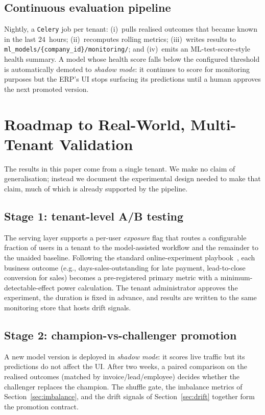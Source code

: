 \documentclass[conference]{IEEEtran}
\begin{document}
\subsection{Continuous evaluation pipeline}
Nightly, a \texttt{Celery} job per tenant: (i)~pulls realised outcomes that
became known in the last $24$~hours; (ii)~recomputes rolling metrics;
(iii)~writes results to \texttt{ml\_models/\{company\_id\}/monitoring/}; and
(iv)~emits an ML-test-score-style~\cite{breck2017mltest} health summary. A
model whose health score falls below the configured threshold is
automatically demoted to \emph{shadow mode}: it continues to score for
monitoring purposes but the ERP's UI stops surfacing its predictions until
a human approves the next promoted version.

\section{Roadmap to Real-World, Multi-Tenant Validation}
\label{sec:realworld}

The results in this paper come from a single tenant. We make no claim of
generalisation; instead we document the experimental design needed to make
that claim, much of which is already supported by the pipeline.

\subsection{Stage 1: tenant-level A/B testing}
The serving layer supports a per-user \emph{exposure} flag that routes a
configurable fraction of users in a tenant to the model-assisted workflow
and the remainder to the unaided baseline. Following the standard
online-experiment playbook~\cite{kohavi2009online}, each business outcome
(e.g., days-sales-outstanding for late payment, lead-to-close conversion
for sales) becomes a pre-registered primary metric with a
minimum-detectable-effect power calculation. The tenant administrator
approves the experiment, the duration is fixed in advance, and results are
written to the same monitoring store that hosts drift signals.

\subsection{Stage 2: champion-vs-challenger promotion}
A new model version is deployed in \emph{shadow mode}: it scores live
traffic but its predictions do not affect the UI. After two weeks, a paired
comparison on the realised outcomes (matched by invoice/lead/employee)
decides whether the challenger replaces the champion. The shuffle gate, the
imbalance metrics of Section~\ref{sec:imbalance}, and the drift signals of
Section~\ref{sec:drift} together form the promotion contract.
\end{document}
